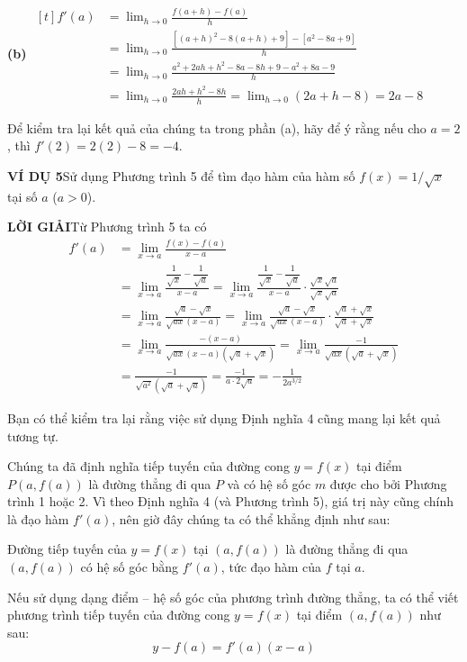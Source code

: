 \noindent
\textbf{(b)}\quad
$\begin{aligned}[t]
f'(a) &= \lim_{h \to 0} \frac{f(a + h) - f(a)}{h} \\[6pt]
&= \lim_{h \to 0} \frac{[(a + h)^2 - 8(a + h) + 9] - [a^2 - 8a + 9]}{h} \\[6pt]
&= \lim_{h \to 0} \frac{a^2 + 2ah + h^2 - 8a - 8h + 9 - a^2 + 8a - 9}{h} \\[6pt]
&= \lim_{h \to 0} \frac{2ah + h^2 - 8h}{h} = \lim_{h \to 0} (2a + h - 8) = 2a - 8
\end{aligned}$

\vspace{8pt}
Để kiểm tra lại kết quả của chúng ta trong phần (a), hãy để ý rằng nếu cho $a = 2$, thì $f'(2) = 2(2) - 8 = -4$.\tombstone

\vspace{12pt}
\noindent
\textbf{\textsf{\color{stewartcyan}VÍ DỤ 5}}\quad Sử dụng Phương trình 5 để tìm đạo hàm của hàm số $f(x) = 1/\sqrt{x}$ tại số $a$ ($a > 0$).

\vspace{4pt}
\noindent
\textbf{\textsf{\color{stewartcyan}LỜI GIẢI}}\quad Từ Phương trình 5 ta có
\[
\begin{aligned}
f'(a) &= \lim_{x \to a} \frac{f(x) - f(a)}{x - a} \\[8pt]
&= \lim_{x \to a} \frac{\dfrac{1}{\sqrt{x}} - \dfrac{1}{\sqrt{a}}}{x - a} = \lim_{x \to a} \frac{\dfrac{1}{\sqrt{x}} - \dfrac{1}{\sqrt{a}}}{x - a} \cdot \frac{\sqrt{x}\sqrt{a}}{\sqrt{x}\sqrt{a}} \\[9pt]
&= \lim_{x \to a} \frac{\sqrt{a} - \sqrt{x}}{\sqrt{ax}(x - a)} = \lim_{x \to a} \frac{\sqrt{a} - \sqrt{x}}{\sqrt{ax}(x - a)} \cdot \frac{\sqrt{a} + \sqrt{x}}{\sqrt{a} + \sqrt{x}} \\[9pt]
&= \lim_{x \to a} \frac{-(x - a)}{\sqrt{ax}(x - a)(\sqrt{a} + \sqrt{x})} = \lim_{x \to a} \frac{-1}{\sqrt{ax}(\sqrt{a} + \sqrt{x})} \\[9pt]
&= \frac{-1}{\sqrt{a^2}(\sqrt{a} + \sqrt{a})} = \frac{-1}{a \cdot 2\sqrt{a}} = -\frac{1}{2a^{3/2}}
\end{aligned}
\]

\vspace{2pt}
Bạn có thể kiểm tra lại rằng việc sử dụng Định nghĩa 4 cũng mang lại kết quả tương tự.\tombstone

\vspace{12pt}
Chúng ta đã định nghĩa tiếp tuyến của đường cong $y = f(x)$ tại điểm $P(a, f(a))$ là đường thẳng đi qua $P$ và có hệ số góc $m$ được cho bởi Phương trình 1 hoặc 2. Vì theo Định nghĩa 4 (và Phương trình 5), giá trị này cũng chính là đạo hàm $f'(a)$, nên giờ đây chúng ta có thể khẳng định như sau:

\vspace{6pt}
\begin{stewartbox}
Đường tiếp tuyến của $y = f(x)$ tại $(a, f(a))$ là đường thẳng đi qua $(a, f(a))$ có hệ số góc bằng $f'(a)$, tức đạo hàm của $f$ tại $a$.
\end{stewartbox}

\vspace{6pt}
Nếu sử dụng dạng điểm -- hệ số góc của phương trình đường thẳng, ta có thể viết phương trình tiếp tuyến của đường cong $y = f(x)$ tại điểm $(a, f(a))$ như sau:
\[
y - f(a) = f'(a)(x - a)
\]
